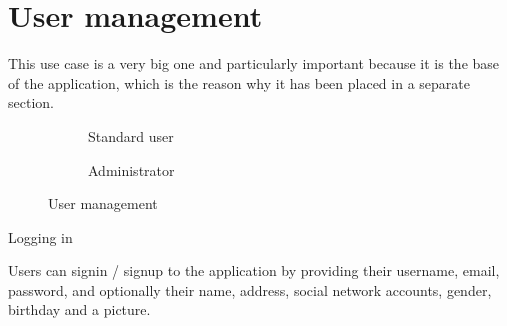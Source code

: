 \section{User management}
This use case is a very big one and particularly important because it is the base of the application, which is the reason why it has been placed in a separate section.

\begin{figure}[h]
  \centering
  \begin{subfigure}{0.45\linewidth}
    \caption{Standard user}
  \end{subfigure}
  \hfill
  \noindent
  \begin{subfigure}{0.45\linewidth}
    \centering
    \caption{Administrator}
  \end{subfigure}
  \caption{User management}
\end{figure}
\subusecasedesc
{Logging in}
{
  Users can signin / signup to the application by providing their username, email, password, and optionally their name, address, social network accounts, gender, birthday and a picture.

}
